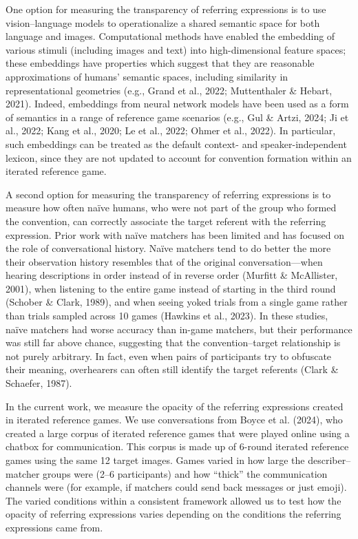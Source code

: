 \documentclass[10pt, letterpaper]{article}
\begin{document}
One option for measuring the transparency of referring expressions is to
use vision--language models to operationalize a shared semantic space
for both language and images. Computational methods have enabled the
embedding of various stimuli (including images and text) into
high-dimensional feature spaces; these embeddings have properties which
suggest that they are reasonable approximations of humans' semantic
spaces, including similarity in representational geometries (e.g., Grand
et al., 2022; Muttenthaler \& Hebart, 2021). Indeed, embeddings from
neural network models have been used as a form of semantics in a range
of reference game scenarios (e.g., Gul \& Artzi, 2024; Ji et al., 2022;
Kang et al., 2020; Le et al., 2022; Ohmer et al., 2022). In particular,
such embeddings can be treated as the default context- and
speaker-independent lexicon, since they are not updated to account for
convention formation within an iterated reference game.

A second option for measuring the transparency of referring expressions
is to measure how often naïve humans, who were not part of the group who
formed the convention, can correctly associate the target referent with
the referring expression. Prior work with naïve matchers has been
limited and has focused on the role of conversational history. Naïve
matchers tend to do better the more their observation history resembles
that of the original conversation---when hearing descriptions in order
instead of in reverse order (Murfitt \& McAllister, 2001), when
listening to the entire game instead of starting in the third round
(Schober \& Clark, 1989), and when seeing yoked trials from a single
game rather than trials sampled across 10 games (Hawkins et al., 2023).
In these studies, naïve matchers had worse accuracy than in-game
matchers, but their performance was still far above chance, suggesting
that the convention--target relationship is not purely arbitrary. In
fact, even when pairs of participants try to obfuscate their meaning,
overhearers can often still identify the target referents (Clark \&
Schaefer, 1987).

In the current work, we measure the opacity of the referring expressions
created in iterated reference games. We use conversations from Boyce et
al. (2024), who created a large corpus of iterated reference games that
were played online using a chatbox for communication. This corpus is
made up of 6-round iterated reference games using the same 12 target
images. Games varied in how large the describer--matcher groups were
(2--6 participants) and how ``thick'' the communication channels were
(for example, if matchers could send back messages or just emoji). The
varied conditions within a consistent framework allowed us to test how
the opacity of referring expressions varies depending on the conditions
the referring expressions came from.
\end{document}
